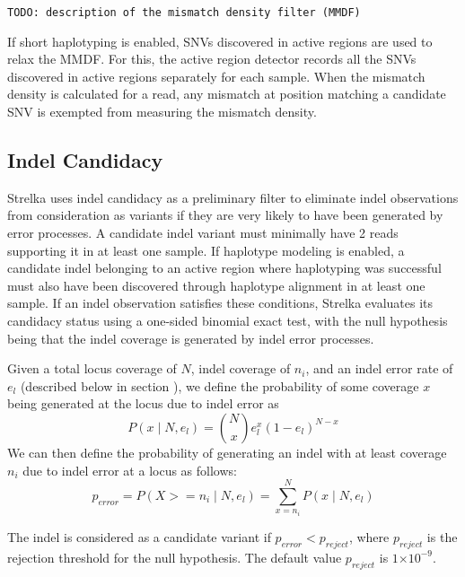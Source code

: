 \documentclass{article}
\newcommand{\e}[1]{\ensuremath{\times 10^{#1}}}
\begin{document}
{\tt TODO: description of the mismatch density filter (MMDF)}

If short haplotyping is enabled, SNVs discovered in active regions are used to relax the MMDF. For this, the active region detector records all the SNVs discovered in active regions separately for each sample. When the mismatch density is calculated for a read, any mismatch at position matching a candidate SNV is exempted from measuring the mismatch density.


\subsection{Indel Candidacy}
\label{sec:IndelCandidacy}

Strelka uses indel candidacy as a preliminary filter to eliminate indel observations from consideration as variants if they are very likely to have been generated by error processes.  A candidate indel variant must minimally have 2 reads supporting it in at least one sample. If haplotype modeling is enabled, a candidate indel belonging to an active region where haplotyping was successful must also have been discovered through haplotype alignment in at least one sample. If an indel observation satisfies these conditions, Strelka evaluates its candidacy status using a one-sided binomial exact test, with the null hypothesis being that the indel coverage is generated by indel error processes.

Given a total locus coverage of $N$, indel coverage of $n_i$, and an indel error rate of $e_l$ (described below in section ), we define the probability of some coverage $x$ being generated at the locus due to indel error as
\begin{equation*}
P(x \mid N, e_l) = \binom {N} {x} e^{x}_l (1 - e_l)^{N - x}
\end{equation*}
We can then define the probability of generating an indel with at least coverage $n_i$ due to indel error at a locus as follows:
\begin{equation*}
p_{error} = P(X >= n_i \mid N, e_l) = \sum_{x = n_i}^{N} P(x \mid N, e_l)
\end{equation*}

\noindent The indel is considered as a candidate variant if $p_{error} < p_{reject}$, where $p_{reject}$ is the rejection threshold for the null hypothesis. The default value $p_{reject}$ is $1\e{-9}$.
\end{document}
